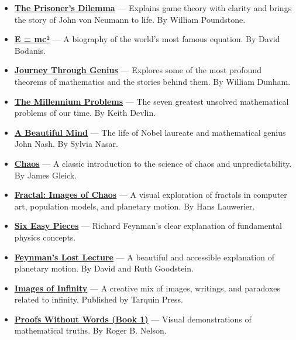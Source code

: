 \documentclass[11pt]{article}
\begin{document}
\begin{itemize}
\item \href{https://isbn.is/9780385415804}{\textbf{The Prisoner's Dilemma}} — Explains game theory with clarity and brings the story of John von Neumann to life. By William Poundstone.

\item \href{https://isbn.is/0333780337}{\textbf{E = mc²}} — A biography of the world's most famous equation. By David Bodanis.

\item \href{https://isbn.is/9780140147391}{\textbf{Journey Through Genius}} — Explores some of the most profound theorems of mathematics and the stories behind them. By William Dunham.

\item \href{https://isbn.is/1862077355}{\textbf{The Millennium Problems}} — The seven greatest unsolved mathematical problems of our time. By Keith Devlin.

\item \href{https://isbn.is/0571212921}{\textbf{A Beautiful Mind}} — The life of Nobel laureate and mathematical genius John Nash. By Sylvia Nasar.

\item \href{https://isbn.is/0749386061}{\textbf{Chaos}} — A classic introduction to the science of chaos and unpredictability. By James Gleick.

\item \href{https://isbn.is/0140144110}{\textbf{Fractal: Images of Chaos}} — A visual exploration of fractals in computer art, population models, and planetary motion. By Hans Lauwerier.

\item \href{https://isbn.is/9780140276664}{\textbf{Six Easy Pieces}} — Richard Feynman’s clear explanation of fundamental physics concepts.

\item \href{https://isbn.is/0099736217}{\textbf{Feynman's Lost Lecture}} — A beautiful and accessible explanation of planetary motion. By David and Ruth Goodstein.

\item \href{https://isbn.is/0906212898}{\textbf{Images of Infinity}} — A creative mix of images, writings, and paradoxes related to infinity. Published by Tarquin Press.

\item \href{https://isbn.is/0883857006}{\textbf{Proofs Without Words (Book 1)}} — Visual demonstrations of mathematical truths. By Roger B. Nelson.


\end{itemize}
\end{document}
